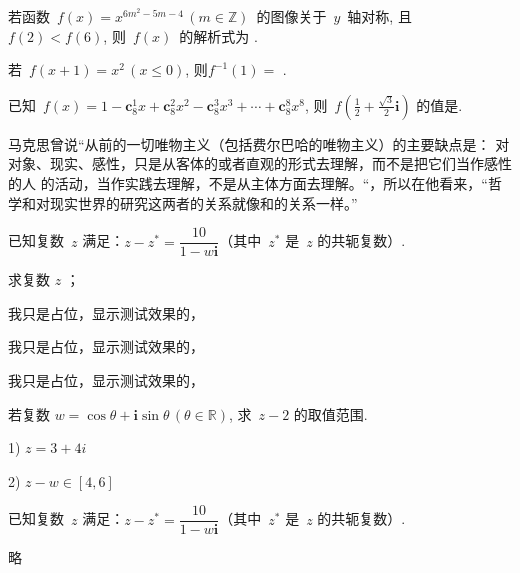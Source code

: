\documentclass[a3paper, landscape, twocolumn, twoside, zihao = 5,
unicodeGBMath, %
]{ctexart}
\begin{document}

\begin{qus}
  
\item 若函数~$f(x)=x^{6m^2-5m-4}\,(m\in\mathbb{Z})$~的图像关于~$y$~轴对称,
  且~$f(2)<f(6)$, 则~$f(x)$~的解析式为 .

\item 若~$f(x+1)=x^2\,(x\leq0)$, 则$f^{-1}(1)=$ .

\item 已知~$f(x)=1-\textbf{c}_8^1x+\textbf{c}_8^2x^2-\textbf{c}_8^3x^3+\cdots+\textbf{c}_8^8x^8$,
  则~$f\left(\tfrac{1}{2}+\tfrac{\sqrt{3}}{2}\textbf{i}\right)$ 的值是.

\item 马克思曾说“从前的一切唯物主义（包括费尔巴哈的唯物主义）的主要缺点是：
  对对象、现实、感性，只是从客体的或者直观的形式去理解，而不是把它们当作感性的人
  的活动，当作实践去理解，不是从主体方面去理解。“，所以在他看来，“哲学和对现实世界的研究这两者的关系就像和的关系一样。”

\end{qus}

\clearpage


\begin{qus}
  
\item 已知复数~$z$ 满足：${z}-z^*=\dfrac{10}{1-w\textbf{i}}$（其中~$z^*$
  是~$z$ 的共轭复数）.

  \begin{qus}
  \item 求复数 $z$ ；
    \begin{qus}
    \item 我只是占位，显示测试效果的，
    \item 我只是占位，显示测试效果的，
    \item 我只是占位，显示测试效果的，
    \end{qus}
  \item 若复数 $w=\cos\theta+\textbf{i}\sin\theta\,(\theta\in\mathbb{R})$, 求~${z-2}$ 的取值范围.
  \end{qus}

  \begin{solution}[5cm]
    1) $z=3+4\check{}{i}$

    2) ${z-w}\in[4,6]$
  \end{solution}

\item 已知复数~$z$ 满足：${z}-z^*=\dfrac{10}{1-w\textbf{i}}$（其中~$z^*$
  是~$z$ 的共轭复数）.
  \begin{solution}
    略
  \end{solution}
\end{qus}
\end{document}
